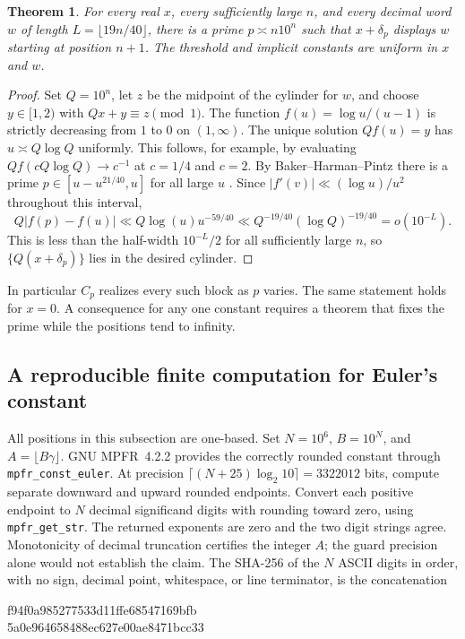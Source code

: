 \documentclass[11pt,a4paper]{article}
\newtheorem{theorem}{Theorem}[section]
\theoremstyle{definition}\newtheorem{definition}[theorem]{Definition}\newtheorem{example}[theorem]{Example}
\theoremstyle{remark}\newtheorem{remark}[theorem]{Remark}
\begin{document}
\begin{theorem}\label{thm:moving-prime-words}
For every real $x$, every sufficiently large $n$, and every decimal word $w$
of length $L=\lfloor19n/40\rfloor$, there is a prime $p\asymp n10^n$ such
that $x+\delta_p$ displays $w$ starting at position $n+1$. The threshold
and implicit constants are uniform in $x$ and $w$.
\end{theorem}
\begin{proof}
Set $Q=10^n$, let $z$ be the midpoint of the cylinder for $w$, and choose
$y\in[1,2)$ with $Qx+y\equiv z\pmod1$. The function $f(u)=\log u/(u-1)$
is strictly decreasing from $1$ to $0$ on $(1,\infty)$. The unique solution
$Qf(u)=y$ has $u\asymp Q\log Q$ uniformly. This follows, for example, by
evaluating $Q f(cQ\log Q)\to c^{-1}$ at $c=1/4$ and $c=2$.
By Baker--Harman--Pintz there is a prime $p\in[u-u^{21/40},u]$ for all
large $u$ \cite[Theorem~1]{BHP}. Since $|f'(v)|\ll(\log u)/u^2$ throughout
this interval,
\[
 Q|f(p)-f(u)|\ll Q\log(u)u^{-59/40}
     \ll Q^{-19/40}(\log Q)^{-19/40}=o(10^{-L}).
\]
This is less than the half-width $10^{-L}/2$ for all sufficiently large $n$,
so $\{Q(x+\delta_p)\}$ lies in the desired cylinder.
\end{proof}
In particular $C_p$ realizes every such block as $p$ varies. The same statement
holds for $x=0$. A consequence for any one constant requires a theorem that
fixes the prime while the positions tend to infinity.
\subsection{A reproducible finite computation for Euler's constant}\label{subsec:finite-orbit-cert}
All positions in this subsection are one-based. Set $N=10^6$, $B=10^N$,
and $A=\lfloor B\gamma\rfloor$. GNU MPFR~4.2.2 provides the correctly
rounded constant through \texttt{mpfr\_const\_euler}. At precision
$\lceil (N+25)\log_2 10\rceil=3322012$ bits, compute separate downward
and upward rounded endpoints. Convert each positive endpoint to $N$ decimal
significand digits with rounding toward zero, using \texttt{mpfr\_get\_str}.
The returned exponents are zero and the two digit strings agree. Monotonicity
of decimal truncation certifies the integer $A$; the guard precision alone
would not establish the claim. The SHA-256 of the $N$ ASCII digits in order,
with no sign, decimal point, whitespace, or line terminator, is the concatenation
\begin{center}\ttfamily\small
f94f0a985277533d11ffe68547169bfb\\[-2pt]
5a0e964658488ec627e00ae8471bcc33
\end{center}
\end{document}
